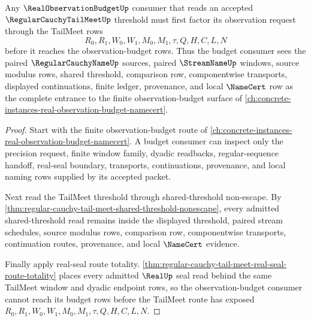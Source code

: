 \begin{theorem}
\label{thm:regular-cauchy-tail-meet-observation-budget-factorization}
Any $\RealObservationBudgetUp$ consumer that reads an accepted $\RegularCauchyTailMeetUp$ threshold must first factor its observation request through the TailMeet rows
$$
R_0,R_1,W_0,W_1,M_0,M_1,\tau,Q,H,C,L,N
$$
before it reaches the observation-budget rows. Thus the budget consumer sees the paired $\RegularCauchyNameUp$ sources, paired $\StreamNameUp$ windows, source modulus rows, shared threshold, comparison row, componentwise transports, displayed continuations, finite ledger, provenance, and local $\NameCert$ row as the complete entrance to the finite observation-budget surface of \autoref{ch:concrete-instances-real-observation-budget-namecert}.
\end{theorem}
\begin{proof}
Start with the finite observation-budget route of \autoref{ch:concrete-instances-real-observation-budget-namecert}. A budget consumer can inspect only the precision request, finite window family, dyadic readbacks, regular-sequence handoff, real-seal boundary, transports, continuations, provenance, and local naming rows supplied by its accepted packet.

Next read the TailMeet threshold through shared-threshold non-escape. By \autoref{thm:regular-cauchy-tail-meet-shared-threshold-nonescape}, every admitted shared-threshold read remains inside the displayed threshold, paired stream schedules, source modulus rows, comparison row, componentwise transports, continuation routes, provenance, and local $\NameCert$ evidence.

Finally apply real-seal route totality. \autoref{thm:regular-cauchy-tail-meet-real-seal-route-totality} places every admitted $\RealUp$ seal read behind the same TailMeet window and dyadic endpoint rows, so the observation-budget consumer cannot reach its budget rows before the TailMeet route has exposed $R_0,R_1,W_0,W_1,M_0,M_1,\tau,Q,H,C,L,N$.
\end{proof}

